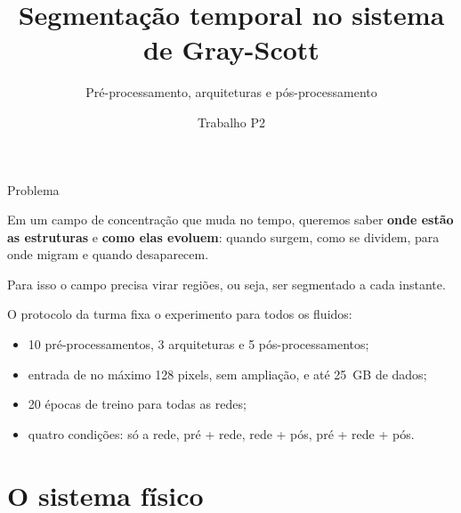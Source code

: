 \documentclass[aspectratio=169,11pt]{beamer}
\title{Segmentação temporal no sistema de Gray-Scott}
\subtitle{Pré-processamento, arquiteturas e pós-processamento}
\author{\autores}
\institute{Processamento de Imagens \\ Universidade Federal do Maranhão \\ \professor}
\date{Trabalho P2}
\begin{document}
\maketitle

\begin{frame}{Problema}

  Em um campo de concentração que muda no tempo, queremos saber
  \textbf{onde estão as estruturas} e \textbf{como elas evoluem}: quando surgem,
  como se dividem, para onde migram e quando desaparecem.

  Para isso o campo precisa virar regiões, ou seja, ser segmentado a cada instante.

  \vspace{.3em}
  O protocolo da turma fixa o experimento para todos os fluidos:
  \begin{itemize}
    \item 10 pré-processamentos, 3 arquiteturas e 5 pós-processamentos;
    \item entrada de no máximo 128 pixels, sem ampliação, e até 25~GB de dados;
    \item 20 épocas de treino para todas as redes;
    \item quatro condições: só a rede, pré + rede, rede + pós, pré + rede + pós.
  \end{itemize}

\end{frame}

\section{O sistema físico}
\end{document}
